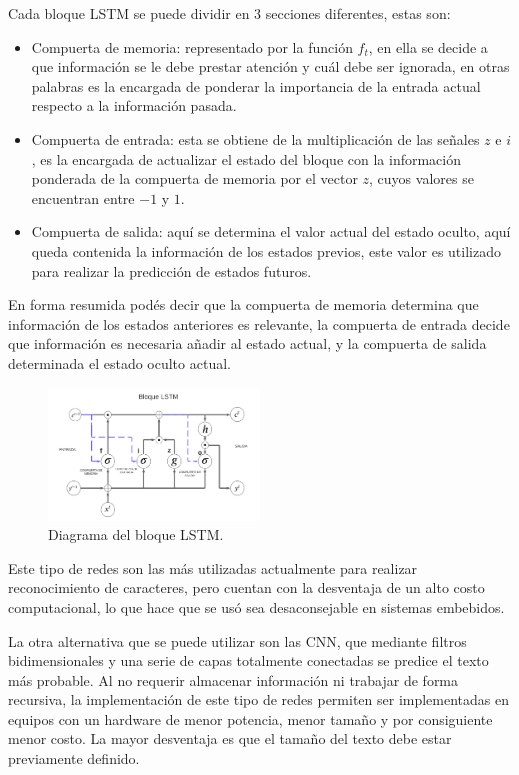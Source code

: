 Cada bloque LSTM se puede dividir en 3 secciones diferentes, estas son:
 \begin{itemize}
    \item Compuerta de memoria: representado por la función $f_{t}$, en ella se decide a que información se le debe prestar atención y cuál debe ser ignorada, en otras palabras es la encargada de ponderar la importancia de la entrada actual respecto a la información pasada.
    \item Compuerta de entrada: esta se obtiene de la multiplicación de las señales $z$ e $i$, es la encargada de actualizar el estado del bloque con la información ponderada de la compuerta de memoria por el vector $z$, cuyos valores se encuentran entre $-1$ y $1$.
    \item Compuerta de salida: aquí se determina el valor actual del estado oculto, aquí queda contenida la información de los estados previos, este valor es utilizado para realizar la predicción de estados futuros.
 \end{itemize}
 En forma resumida podés decir que la compuerta de memoria determina que información de los estados anteriores es relevante, la compuerta de entrada decide que información es necesaria añadir al estado actual, y la compuerta de salida determinada el estado oculto actual.
\begin{figure}[h]
    \centering
    \includegraphics[width=0.5\textwidth]{imgs/diagrama-lstm.png}
    \caption{Diagrama del bloque LSTM.}
    \label{fig:diagrama-LSTM}
\end{figure}

Este tipo de redes son las más utilizadas actualmente para realizar reconocimiento de caracteres, pero cuentan con la desventaja de un alto costo computacional, lo que hace que se usó sea desaconsejable en sistemas embebidos.

La otra alternativa que se puede utilizar son las CNN, que mediante filtros bidimensionales y una serie de capas totalmente conectadas se predice el texto más probable.
Al no requerir almacenar información ni trabajar de forma recursiva, la implementación
de este tipo de redes permiten ser implementadas en equipos con un hardware de menor potencia, menor tamaño y por consiguiente menor costo. La mayor desventaja es que el tamaño del texto debe estar previamente definido.

